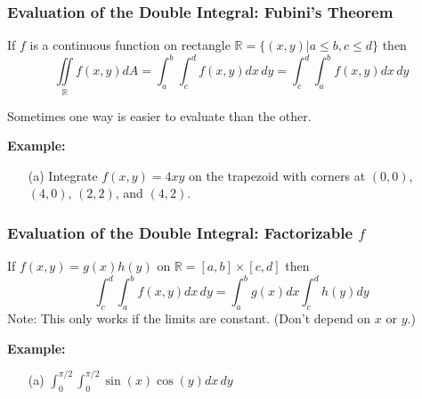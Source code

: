 \documentclass{beamer}
\begin{document}
\begin{frame}
\frametitle{\textbf{Evaluation of the Double Integral: Fubini's Theorem}}

\begin{theorem}
	If $f$ is a continuous function on rectangle $\mathbb{R} = \{(x,y)|a\leq b, c\leq d \}$ then
	$$\iint\limits_{\mathbb{R}} f(x,y)dA = \int_a^b \int_c^d f(x,y)dx\,dy = \int_c^d \int_a^b  f(x,y)dx\,dy $$
\end{theorem}

Sometimes one way is easier to evaluate than the other.\\
\vspace{12pt}

\textbf{Example:}

\begin{itemize}
	\item[(a)] Integrate $f(x,y) = 4xy$ on the trapezoid with corners at $(0,0)$, $(4,0)$, $(2,2)$, and $(4,2)$.
\end{itemize}
\end{frame}

\begin{frame}
\frametitle{\textbf{Evaluation of the Double Integral: Factorizable $f$}}
If $f(x,y) = g(x)h(y)$ on $\mathbb{R} = [a,b] \times [c,d]$ then
$$\int_c^d \int_a^b f(x,y) dx\,dy = \int_a^bg(x)dx \int_c^d h(y)dy$$
Note: This only works if the limits are constant. (Don't depend on $x$ or $y$.)
\vspace{12pt}

\textbf{Example:}
\begin{itemize}
	\item[(a)] $\int_0^{\pi/2} \int_0^{\pi/2} \sin(x) \cos(y) dx \,dy$
\end{itemize}
\end{frame}
\end{document}
